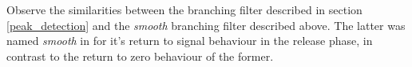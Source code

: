 \documentclass[../main2.tex]{subfiles}
\begin{document}
Observe the similarities between the branching filter described in section \ref{peak_detection} and the \emph{smooth} branching filter described above. The latter was named \emph{smooth} in \cite{reiss2012tutorial} for it's return to signal behaviour in the release phase, in contrast to the return to zero behaviour of the former.
\end{document}
